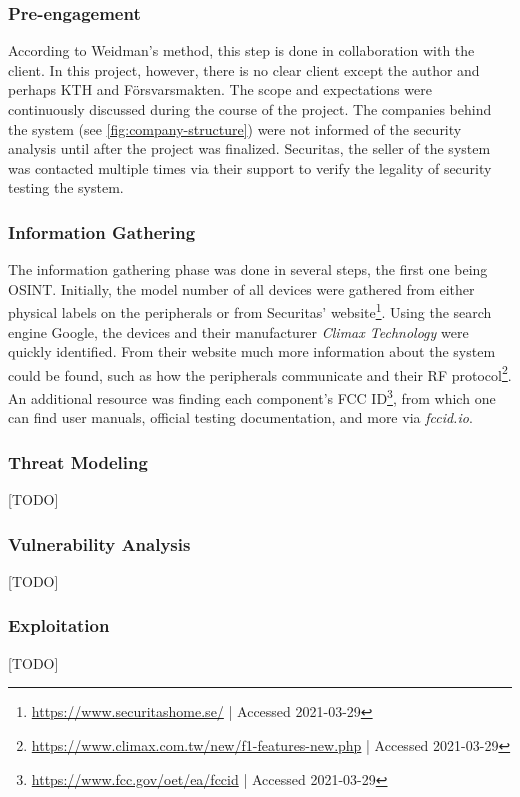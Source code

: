 \subsubsection{Pre-engagement}
According to Weidman's method, this step is done in collaboration with the client. In this project, however, there is no clear client except the author and perhaps KTH and Försvarsmakten. The scope and expectations were continuously discussed during the course of the project. The companies behind the system (see \ref{fig:company-structure}) were not informed of the security analysis until after the project was finalized. Securitas, the seller of the system was contacted multiple times via their support to verify the legality of security testing the system.

\subsubsection{Information Gathering}
The information gathering phase was done in several steps, the first one being \gls{OSINT}. Initially, the model number of all devices were gathered from either physical labels on the peripherals or from Securitas' website\footnote{\url{https://www.securitashome.se/} | Accessed 2021-03-29}. Using the search engine Google, the devices and their manufacturer \textit{Climax Technology} were quickly identified. From their website much more information about the system could be found, such as how the peripherals communicate and their \gls{RF} protocol\footnote{\url{https://www.climax.com.tw/new/f1-features-new.php} | Accessed 2021-03-29}. An additional resource was finding each component's FCC ID\footnote{\url{https://www.fcc.gov/oet/ea/fccid} | Accessed 2021-03-29}, from which one can find user manuals, official testing documentation, and more via \textit{fccid.io}.

\subsubsection{Threat Modeling}
[TODO]

\subsubsection{Vulnerability Analysis}
[TODO]

\subsubsection{Exploitation}
[TODO]


